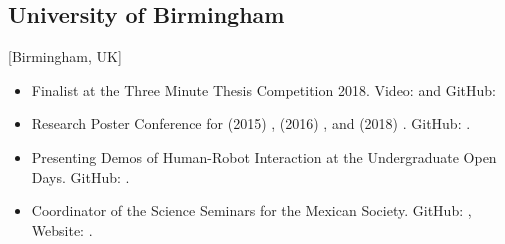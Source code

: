 \documentclass{mycv}
\begin{document}
\subsection{University of Birmingham}[Birmingham, UK]
\begin{positions}
\end{positions}
\begin{itemize}
\item  Finalist at the Three Minute Thesis Competition 2018. Video: \href{https://www.youtube.com/watch?v=07ewRYcS-0g}{\faYoutube} and 
GitHub: \href{https://github.com/mxochicale/3mt}{\faGithubAlt} 

\item Research Poster Conference for 
(2015) \href{https://github.com/mxochicale/PhD/blob/master/posters/Research_Poster_Conference_UoB/2015/poster/poster.pdf}{\faImage}, 
(2016) \href{https://github.com/mxochicale/PhD/blob/master/posters/Research_Poster_Conference_UoB/2016/poster/poster.pdf}{\faImage}, and  
(2018) \href{https://github.com/mxochicale/PhD/blob/master/posters/Research_Poster_Conference_UoB/2018/poster/main/map479-poster-uob2018.pdf}{\faImage}.
GitHub: \href{https://github.com/mxochicale/PhD/tree/master/posters/Research_Poster_Conference_UoB}{\faGithubAlt}. \\

\item Presenting Demos of Human-Robot Interaction at the Undergraduate Open Days. GitHub: \href{https://github.com/mxochicale/opendayuob-hridemo}{\faGithubAlt}. 

\item Coordinator of the Science Seminars for the Mexican Society.  GitHub: \href{https://github.com/MexicanSocietyUoB}{\faGithubAlt}, Website: \href{https://mexicansocietyuob.github.io/seminars/}{\faExternalLink}. 

\end{itemize}
\end{document}
